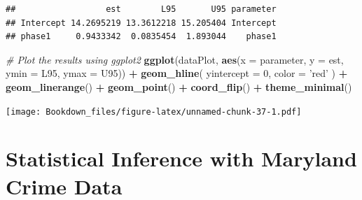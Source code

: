 \documentclass[]{book}
\newenvironment{Shaded}{\begin{snugshade}}{\end{snugshade}}
\newcommand{\KeywordTok}[1]{\textcolor[rgb]{0.13,0.29,0.53}{\textbf{#1}}}
\newcommand{\DataTypeTok}[1]{\textcolor[rgb]{0.13,0.29,0.53}{#1}}
\newcommand{\DecValTok}[1]{\textcolor[rgb]{0.00,0.00,0.81}{#1}}
\newcommand{\StringTok}[1]{\textcolor[rgb]{0.31,0.60,0.02}{#1}}
\newcommand{\CommentTok}[1]{\textcolor[rgb]{0.56,0.35,0.01}{\textit{#1}}}
\newcommand{\OperatorTok}[1]{\textcolor[rgb]{0.81,0.36,0.00}{\textbf{#1}}}
\newcommand{\NormalTok}[1]{#1}
\begin{document}
\begin{Shaded}
\end{Shaded}

\begin{verbatim}
##                  est        L95       U95 parameter
## Intercept 14.2695219 13.3612218 15.205404 Intercept
## phase1     0.9433342  0.0835454  1.893044    phase1
\end{verbatim}

\begin{Shaded}
\begin{Highlighting}[]
\CommentTok{# Plot the results using ggplot2}
\KeywordTok{ggplot}\NormalTok{(dataPlot, }\KeywordTok{aes}\NormalTok{(}\DataTypeTok{x =}\NormalTok{ parameter, }\DataTypeTok{y =}\NormalTok{ est, }\DataTypeTok{ymin =}\NormalTok{ L95, }\DataTypeTok{ymax =}\NormalTok{ U95)) }\OperatorTok{+}
\StringTok{  }\KeywordTok{geom_hline}\NormalTok{( }\DataTypeTok{yintercept =} \DecValTok{0}\NormalTok{, }\DataTypeTok{color =} \StringTok{'red'}\NormalTok{ ) }\OperatorTok{+}
\StringTok{  }\KeywordTok{geom_linerange}\NormalTok{() }\OperatorTok{+}\StringTok{ }
\StringTok{  }\KeywordTok{geom_point}\NormalTok{() }\OperatorTok{+}\StringTok{ }
\StringTok{  }\KeywordTok{coord_flip}\NormalTok{() }\OperatorTok{+}\StringTok{ }
\StringTok{  }\KeywordTok{theme_minimal}\NormalTok{()}
\end{Highlighting}
\end{Shaded}

\texttt{[image: Bookdown\_files/figure-latex/unnamed-chunk-37-1.pdf]}

\chapter{Statistical Inference with Maryland Crime
Data}\label{statistical-inference-with-maryland-crime-data}


\end{document}
